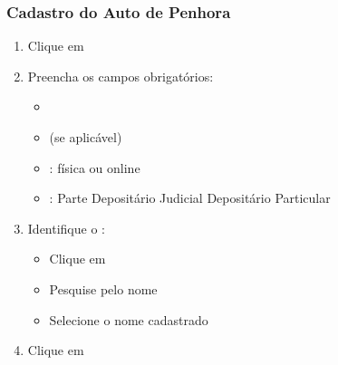 \documentclass[letterpaper,10pt,brazil]{sphinxmanual}
\begin{document}
\subsubsection{Cadastro do Auto de Penhora}
\label{\detokenize{projud_21_cadastrobempenhora:cadastro-do-auto-de-penhora}}\begin{enumerate}
%
\item {} 
\sphinxAtStartPar
Clique em 

\item {} 
\sphinxAtStartPar
Preencha os campos obrigatórios:
\begin{itemize}
\item {} 
\sphinxAtStartPar
{}

\item {} 
\sphinxAtStartPar
{} (se aplicável)

\item {} 
\sphinxAtStartPar
{}: física ou online

\item {} 
\sphinxAtStartPar
{}:
\sphinxhyphen{} Parte
\sphinxhyphen{} Depositário Judicial
\sphinxhyphen{} Depositário Particular

\end{itemize}

\item {} 
\sphinxAtStartPar
Identifique o :
\begin{itemize}
\item {} 
\sphinxAtStartPar
Clique em 

\item {} 
\sphinxAtStartPar
Pesquise pelo nome

\item {} 
\sphinxAtStartPar
Selecione o nome cadastrado

\end{itemize}

\item {} 
\sphinxAtStartPar
Clique em 

\end{enumerate}
\end{document}
